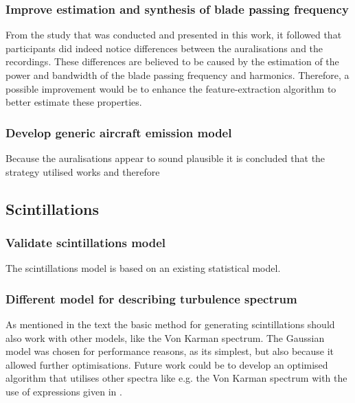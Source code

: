 \subsubsection*{Improve estimation and synthesis of blade passing frequency}
From the study that was conducted and presented in this work, it followed that
participants did indeed notice differences between the auralisations and the
recordings. These differences are believed to be caused by the estimation of the
power and bandwidth of the blade passing frequency and harmonics. Therefore, a
possible improvement would be to enhance the feature-extraction algorithm to
better estimate these properties.


\subsubsection*{Develop generic aircraft emission model}
Because the auralisations appear to sound plausible it is concluded that the strategy
utilised works and therefore


\subsection{Scintillations}

\subsubsection*{Validate scintillations model}
The scintillations model is based on an existing statistical model.

\subsubsection*{Different model for describing turbulence spectrum}
As mentioned in the text the basic method for generating scintillations should
also work with other models, like the Von Karman spectrum. The Gaussian model
was chosen for performance reasons, as its simplest, but also because it allowed
further optimisations. Future work could be to develop an optimised algorithm
that utilises other spectra like e.g. the Von Karman spectrum with the use of
expressions given in \cite{Ostashev2015}.

